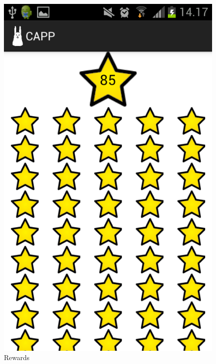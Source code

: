 \begin{figure}
	\begin{minipage}[b]{0.4\linewidth}
		\centering
		\includegraphics[width=0.20\paperwidth]{Pictures/app-screenshots/capp_stars.png}
		\caption{Rewards}
		\label{fig:capp_stars}
	\end{minipage}
	\hspace{3cm}
	\begin{minipage}[b]{0.4\linewidth}
		\centering

\end{minipage}
\end{figure}
